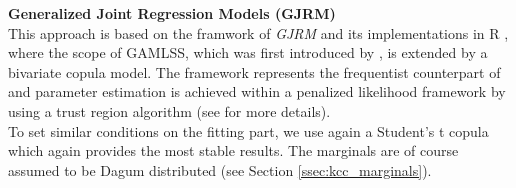 

\textbf{Generalized Joint Regression Models (GJRM)}\\
This approach is based on the framwork of \textit{\ac{GJRM}} and its implementations in R \citep{marra1605bivariate, marragjrm}, where the scope of \ac{GAMLSS}, which was first introduced by \cite{rigby2005generalized}, is extended by a bivariate copula model. The framework represents the frequentist counterpart of \cite{klein2016simultaneous} and parameter estimation is achieved within a penalized likelihood framework by using a trust region algorithm (see \cite{marragjrm} for more details). \\

To set similar conditions on the fitting part, we use again a Student's t copula which again provides the most stable results. The marginals are of course assumed to be Dagum distributed (see Section \ref{ssec:kcc_marginals}). %



